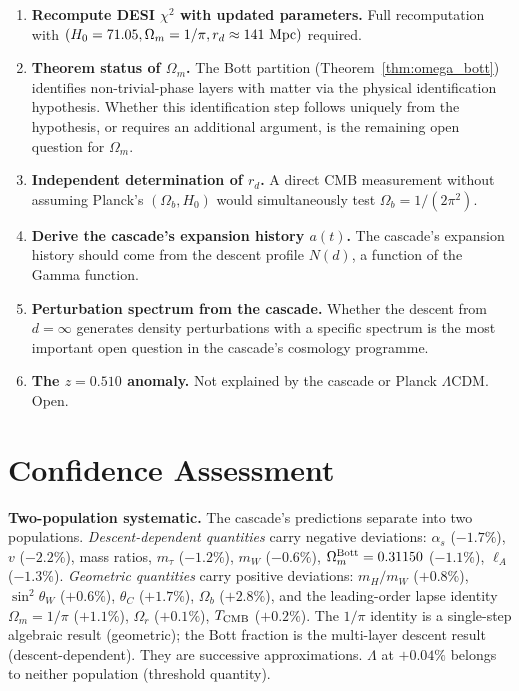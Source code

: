 \documentclass[12pt,a4paper]{article}
\begin{document}
\begin{enumerate}
\item \textbf{Recompute DESI $\chi^2$ with updated parameters.} Full recomputation with
$(H_0 = 71.05, \Omega_m = 1/\pi, r_d \approx 141~{\rm Mpc})$ required.
\item \textbf{Theorem status of $\Omega_m$.} The Bott partition (Theorem~\ref{thm:omega_bott})
identifies non-trivial-phase layers with matter via the physical identification
hypothesis. Whether this identification step follows uniquely from the hypothesis,
or requires an additional argument, is the remaining open question for $\Omega_m$.
\item \textbf{Independent determination of $r_d$.} A direct CMB measurement without assuming
Planck's $(\Omega_b, H_0)$ would simultaneously test $\Omega_b = 1/(2\pi^2)$.
\item \textbf{Derive the cascade's expansion history $a(t)$.} The cascade's expansion history
should come from the descent profile $N(d)$, a function of the Gamma function.
\item \textbf{Perturbation spectrum from the cascade.} Whether the descent from $d = \infty$
generates density perturbations with a specific spectrum is the most important open
question in the cascade's cosmology programme.
\item \textbf{The $z = 0.510$ anomaly.} Not explained by the cascade or Planck $\Lambda$CDM. Open.
\end{enumerate}

\section{Confidence Assessment}

\textbf{Two-population systematic.} The cascade's predictions separate into two populations.
\textit{Descent-dependent quantities} carry negative deviations: $\alpha_s$ ($-1.7\%$), $v$
($-2.2\%$), mass ratios, $m_\tau$ ($-1.2\%$), $m_W$ ($-0.6\%$), $\Omega_m^{\rm Bott} = 0.31150$
($-1.1\%$), $\ell_A$ ($-1.3\%$). \textit{Geometric quantities} carry positive deviations:
$m_H/m_W$ ($+0.8\%$), $\sin^2\theta_W$ ($+0.6\%$), $\theta_C$ ($+1.7\%$), $\Omega_b$ ($+2.8\%$),
and the leading-order lapse identity $\Omega_m = 1/\pi$ ($+1.1\%$), $\Omega_r$ ($+0.1\%$),
$T_{\rm CMB}$ ($+0.2\%$). The $1/\pi$ identity is a single-step algebraic result (geometric);
the Bott fraction is the multi-layer descent result (descent-dependent). They are successive
approximations. $\Lambda$ at $+0.04\%$ belongs to neither population (threshold quantity).
\end{document}
